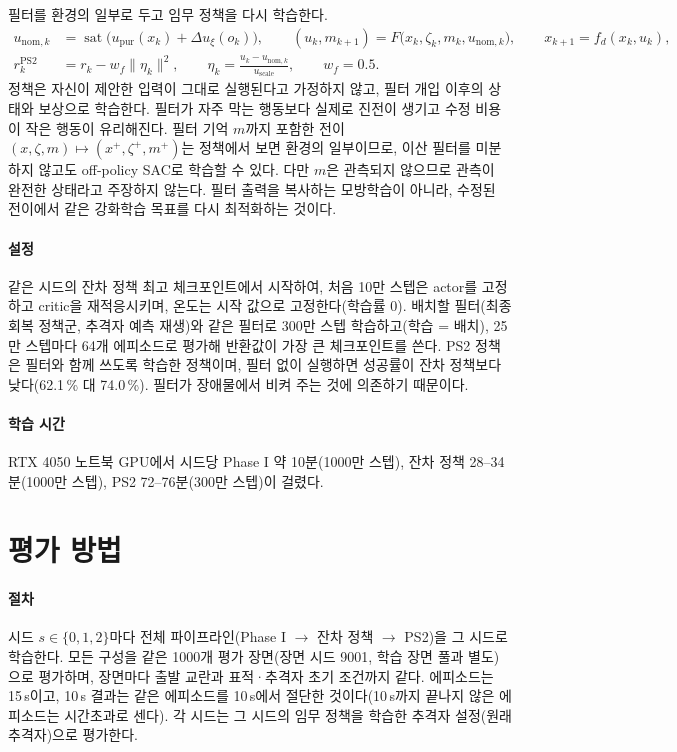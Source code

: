 \documentclass[10pt,a4paper]{article}
\newcommand{\sat}{\operatorname{sat}}
\newcommand{\upur}{u_{\mathrm{pur}}}
\begin{document}
필터를 환경의 일부로 두고 임무 정책을 다시 학습한다.
\begin{align}
u_{\mathrm{nom},k}&=\sat\big(\upur(x_k)+\Delta u_\xi(o_k)\big),\qquad (u_k,m_{k+1})=F\big(x_k,\zeta_k,m_k,u_{\mathrm{nom},k}\big),\qquad x_{k+1}=f_d(x_k,u_k), \label{eq:ps2}\\
r^{\mathrm{PS2}}_k&=r_k-w_f\|\eta_k\|^2,\qquad \eta_k=\frac{u_k-u_{\mathrm{nom},k}}{u_{\mathrm{scale}}},\qquad w_f=0.5 . \label{eq:ps2-reward}
\end{align}
정책은 자신이 제안한 입력이 그대로 실행된다고 가정하지 않고, 필터 개입 이후의 상태와 보상으로 학습한다. 필터가 자주 막는 행동보다 실제로 진전이 생기고 수정 비용이 작은 행동이 유리해진다.
필터 기억 $m$까지 포함한 전이 $(x,\zeta,m)\mapsto(x^+,\zeta^+,m^+)$는 정책에서 보면 환경의 일부이므로, 이산 필터를 미분하지 않고도 off-policy SAC로 학습할 수 있다.
다만 $m$은 관측되지 않으므로 관측이 완전한 상태라고 주장하지 않는다. 필터 출력을 복사하는 모방학습이 아니라, 수정된 전이에서 같은 강화학습 목표를 다시 최적화하는 것이다.

\paragraph{설정} 같은 시드의 잔차 정책 최고 체크포인트에서 시작하여, 처음 10만 스텝은 actor를 고정하고 critic을 재적응시키며, 온도는 시작 값으로 고정한다(학습률 0).
배치할 필터(최종 회복 정책군, 추격자 예측 재생)와 같은 필터로 300만 스텝 학습하고(학습 = 배치), 25만 스텝마다 64개 에피소드로 평가해 반환값이 가장 큰 체크포인트를 쓴다.
PS2 정책은 필터와 함께 쓰도록 학습한 정책이며, 필터 없이 실행하면 성공률이 잔차 정책보다 낮다(62.1\,\% 대 74.0\,\%). 필터가 장애물에서 비켜 주는 것에 의존하기 때문이다.

\paragraph{학습 시간} RTX 4050 노트북 GPU에서 시드당 Phase I 약 10분(1000만 스텝), 잔차 정책 28--34분(1000만 스텝), PS2 72--76분(300만 스텝)이 걸렸다.

\section{평가 방법}\label{sec:protocol}

\paragraph{절차} 시드 $s\in\{0,1,2\}$마다 전체 파이프라인(Phase I $\to$ 잔차 정책 $\to$ PS2)을 그 시드로 학습한다.
모든 구성을 같은 1000개 평가 장면(장면 시드 9001, 학습 장면 풀과 별도)으로 평가하며, 장면마다 출발 교란과 표적·추격자 초기 조건까지 같다.
에피소드는 15\,s이고, 10\,s 결과는 같은 에피소드를 10\,s에서 절단한 것이다(10\,s까지 끝나지 않은 에피소드는 시간초과로 센다).
각 시드는 그 시드의 임무 정책을 학습한 추격자 설정(원래 추격자)으로 평가한다.
\end{document}
